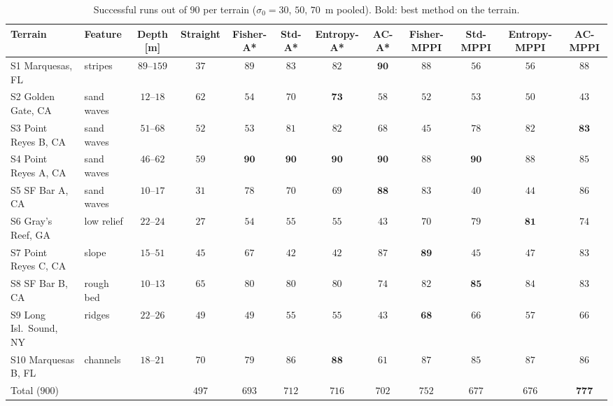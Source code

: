 \documentclass[letterpaper, 10 pt, journal, twoside]{IEEEtran}
\begin{document}
\begin{table}
  \centering
  \caption{Successful runs out of $90$ per terrain ($\sigma_0 = 30$, $50$, $70$~m pooled). Bold: best method on the terrain.}
  \footnotesize
  \setlength{\tabcolsep}{4.0pt}
  \begin{tabular}{l l c c c c c c c c c c}
    \hline
    \textbf{Terrain} & \textbf{Feature} & \textbf{Depth [m]} & \textbf{Straight} & \textbf{Fisher-A*} & \textbf{Std-A*} & \textbf{Entropy-A*} & \textbf{AC-A*} & \textbf{Fisher-MPPI} & \textbf{Std-MPPI} & \textbf{Entropy-MPPI} & \textbf{AC-MPPI} \\
    \hline
    S1 Marquesas, FL       & stripes    & $89$--$159$ & $37$ & $89$ & $83$ & $82$ & $\mathbf{90}$ & $88$ & $56$ & $56$ & $88$ \\
    S2 Golden Gate, CA     & sand waves & $12$--$18$  & $62$ & $54$ & $70$ & $\mathbf{73}$ & $58$ & $52$ & $53$ & $50$ & $43$ \\
    S3 Point Reyes B, CA   & sand waves & $51$--$68$  & $52$ & $53$ & $81$ & $82$ & $68$ & $45$ & $78$ & $82$ & $\mathbf{83}$ \\
    S4 Point Reyes A, CA   & sand waves & $46$--$62$  & $59$ & $\mathbf{90}$ & $\mathbf{90}$ & $\mathbf{90}$ & $\mathbf{90}$ & $88$ & $\mathbf{90}$ & $88$ & $85$ \\
    S5 SF Bar A, CA        & sand waves & $10$--$17$  & $31$ & $78$ & $70$ & $69$ & $\mathbf{88}$ & $83$ & $40$ & $44$ & $86$ \\
    S6 Gray's Reef, GA     & low relief & $22$--$24$  & $27$ & $54$ & $55$ & $55$ & $43$ & $70$ & $79$ & $\mathbf{81}$ & $74$ \\
    S7 Point Reyes C, CA   & slope      & $15$--$51$  & $45$ & $67$ & $42$ & $42$ & $87$ & $\mathbf{89}$ & $45$ & $47$ & $83$ \\
    S8 SF Bar B, CA        & rough bed  & $10$--$13$  & $65$ & $80$ & $80$ & $80$ & $74$ & $82$ & $\mathbf{85}$ & $84$ & $83$ \\
    S9 Long Isl.\ Sound, NY & ridges    & $22$--$26$  & $49$ & $49$ & $55$ & $55$ & $43$ & $\mathbf{68}$ & $66$ & $57$ & $66$ \\
    S10 Marquesas B, FL    & channels   & $18$--$21$  & $70$ & $79$ & $86$ & $\mathbf{88}$ & $61$ & $87$ & $85$ & $87$ & $86$ \\
    \hline
    \multicolumn{3}{l}{Total ($900$)} & $497$ & $693$ & $712$ & $716$ & $702$ & $752$ & $677$ & $676$ & $\mathbf{777}$ \\
    \hline
  \end{tabular}
  \label{tab:terrain}
  \vspace{-10pt}
\end{table}
\end{document}
